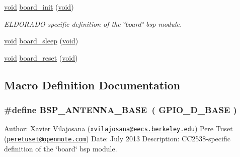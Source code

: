 \begin{DoxyCompactItemize}
\item 
\hyperlink{usb__devapi_8h_afabf60e7f57651d6d595a02c75f07cd0}{void} \hyperlink{group__board_ga916f2adc2080b4fe88034086d107a8dc}{board\+\_\+init} (\hyperlink{usb__devapi_8h_afabf60e7f57651d6d595a02c75f07cd0}{void})
\begin{DoxyCompactList}\small\item\em E\+L\+D\+O\+R\+A\+D\+O-\/specific definition of the \char`\"{}board\char`\"{} bsp module. \end{DoxyCompactList}\item 
\hyperlink{usb__devapi_8h_afabf60e7f57651d6d595a02c75f07cd0}{void} \hyperlink{group__board_ga052cfe534a52d7f046e311d4adec00a8}{board\+\_\+sleep} (\hyperlink{usb__devapi_8h_afabf60e7f57651d6d595a02c75f07cd0}{void})
\item 
\hyperlink{usb__devapi_8h_afabf60e7f57651d6d595a02c75f07cd0}{void} \hyperlink{group__board_gafbd0c8dccf10506bd3912960c8cba369}{board\+\_\+reset} (\hyperlink{usb__devapi_8h_afabf60e7f57651d6d595a02c75f07cd0}{void})
\end{DoxyCompactItemize}


\subsection{Macro Definition Documentation}
\subsubsection[{\texorpdfstring{B\+S\+P\+\_\+\+A\+N\+T\+E\+N\+N\+A\+\_\+\+B\+A\+SE}{BSP_ANTENNA_BASE}}]{\setlength{\rightskip}{0pt plus 5cm}\#define B\+S\+P\+\_\+\+A\+N\+T\+E\+N\+N\+A\+\_\+\+B\+A\+SE~( {\bf G\+P\+I\+O\+\_\+\+D\+\_\+\+B\+A\+SE} )}\hypertarget{_open_mote-_c_c2538_2board_8c_a54e79aca09ca603b2bd7dde3ba7dfdfe}{}\label{_open_mote-_c_c2538_2board_8c_a54e79aca09ca603b2bd7dde3ba7dfdfe}
Author\+: Xavier Vilajosana (\href{mailto:xvilajosana@eecs.berkeley.edu}{\tt xvilajosana@eecs.\+berkeley.\+edu}) Pere Tuset (\href{mailto:peretuset@openmote.com}{\tt peretuset@openmote.\+com}) Date\+: July 2013 Description\+: C\+C2538-\/specific definition of the \char`\"{}board\char`\"{} bsp module. 

